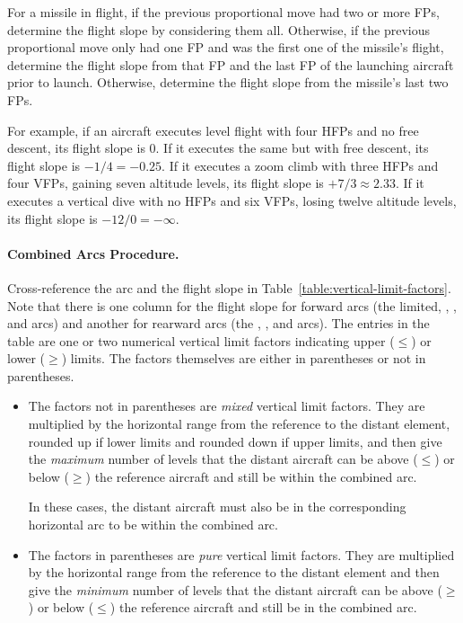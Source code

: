 {For a missile in flight, if the previous proportional move had two or more FPs, determine the flight slope by considering them all. Otherwise, if the previous proportional move only had one FP and was the first one of the missile’s flight, determine the flight slope from that FP and the last FP of the launching aircraft prior to launch. Otherwise, determine the flight slope from the missile’s last two FPs.

For example, if an aircraft executes level flight with four HFPs and no free descent, its flight slope is 0. If it executes the same but with free descent, its flight slope is $-1/4 = -0.25$. If it executes a zoom climb with three HFPs and four VFPs, gaining seven altitude levels, its flight slope is $+7/3 \approx 2.33$. If it executes a vertical dive with no HFPs and six VFPs, losing twelve altitude levels, its flight slope is $-12/0 = -\infty$.

\paragraph{Combined Arcs Procedure.}



Cross-reference the arc and the flight slope in Table~\ref{table:vertical-limit-factors}. Note that there is one column for the flight slope for forward arcs (the limited, , , and  arcs) and another for rearward arcs (the ,  , and   arcs). The entries in the table are one or two numerical vertical limit factors indicating upper ($\le$) or lower ($\ge$) limits. The factors themselves are either in parentheses or not in parentheses.

\begin{itemize}

\item
The factors not in parentheses are \emph{mixed} vertical limit factors. They are multiplied by the horizontal range from the reference to the distant element, rounded up if lower limits and rounded down if upper limits, and then give the \emph{maximum} number of levels that the distant aircraft can be above ($\le$) or below ($\ge$) the reference aircraft and still be within the combined arc. 

In these cases, the distant aircraft must also be in the corresponding horizontal arc to be within the combined arc.

\item
The factors in parentheses are \emph{pure} vertical limit factors. They are multiplied by the horizontal range from the reference to the distant element and then give the \emph{minimum} number of levels that the distant aircraft can be above ($\ge$) or below ($\le$) the reference aircraft and still be in the combined arc. 


\end{itemize}}
